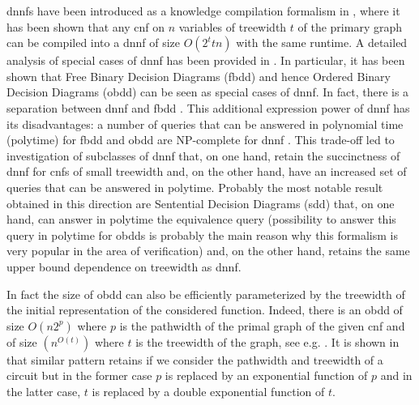 \documentclass{llncs}
\begin{document}
{\sc dnnf}s have been introduced as a knowledge compilation formalism in \cite{DarwicheJACM}, where it has been shown
that any {\sc cnf} on $n$ variables of treewidth $t$ of the primary graph can be compiled into a {\sc dnnf} of size $O(2^ttn)$
with the same runtime. A detailed analysis of special cases of {\sc dnnf} has been provided in \cite{DerMar}. In particular,
it has been shown that Free Binary Decision Diagrams ({\sc fbdd}) and hence Ordered Binary Decision Diagrams ({\sc obdd}) can be seen as special cases of {\sc dnnf}. 
In fact, there is a separation between {\sc dnnf} and {\sc fbdd} \cite{SepDNNFFBDD}. This additional expression power of {\sc dnnf} has 
its disadvantages: a number of queries that can be answered 
in polynomial time (polytime) for {\sc fbdd} and {\sc obdd} are NP-complete for {\sc dnnf} \cite{DerMar}. This trade-off led to investigation of subclasses
of {\sc dnnf} that, on one hand, retain the succinctness of {\sc dnnf} for {\sc cnf}s of small treewidth and, on the other hand, have an increased
set of queries that can be answered in polytime. Probably the most notable result obtained in this direction are
Sentential Decision Diagrams ({\sc sdd}) \cite{SDD} that, on one hand, can answer in polytime the equivalence query
(possibility to answer this query in polytime for {\sc obdd}s is probably the main reason why this formalism is very
popular in the area of verification) and, on the other hand, retains the same upper bound dependence on treewidth
as {\sc dnnf}. 

In fact the size of {\sc obdd} can also be efficiently parameterized by the treewidth of the initial representation of the considered function. 
Indeed, there is an {\sc obdd} of size $O(n2^p)$ where $p$ is the pathwidth of the primal graph of the given
{\sc cnf} and of size $(n^{O(t)})$ where $t$ is the treewidth of the graph, see e.g. \cite{VardiTWD}.
It is shown in \cite{OBDDTWJha} that similar pattern retains if we consider the pathwidth and treewidth of a circuit but in the former
case $p$ is replaced by an exponential function of $p$ and in the latter case, $t$ is replaced by a double exponential function
of $t$. 
   
\end{document}
